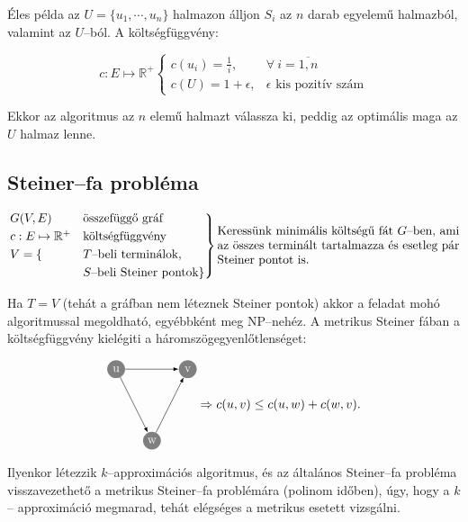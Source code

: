 Éles példa az $U=\{ u_1, \cdots, u_n \}$ halmazon álljon $S_i$ az $n$ darab
egyelemű halmazból, valamint az $U$--ból. A költségfüggvény:

\[ c:E \mapsto \mathbb{R}^+ \begin{cases} c({u_i})=\frac{1}{i}, & \forall~
i=\overline{1,n}\\
c(U)=1 + \epsilon, & \epsilon \mbox{ kis pozitív szám} \end{cases}\]

Ekkor az algoritmus az $n$ elemű halmazt válassza ki, peddig az optimális maga
az $U$ halmaz lenne.

\subsection{Steiner--fa probléma}

\[
\begin{rcases}
G(V,E) &\mbox{összefüggő gráf} \\
c:E \mapsto \mathbb{R}^+ &\mbox{költségfüggvény} \\
V = \{ &T\mbox{--beli terminálok}, \\
	   &S\mbox{--beli Steiner pontok}\}
\end{rcases}
\parbox[L]{7cm}{ Keressünk minimális költségű fát $G$--ben, ami az összes
terminált tartalmazza és esetleg pár Steiner pontot is.} \]

Ha $T=V$ (tehát a gráfban nem léteznek Steiner pontok) akkor a feladat mohó
algoritmussal megoldható, egyébbként meg NP--nehéz. A metrikus Steiner fában
a költségfüggvény kielégiti a háromszögegyenlőtlenséget:


\[ \parbox[l]{2.5cm}{
\begin{tikzpicture}[scale=1]
  \tikzset{ p/.style={circle,white,fill=gray,inner sep=0pt,minimum size=0.5cm},
  }
  \node[p] (1) at (0, -3) {w};
  \node[p] (2) at (-1, -1) {u}; 
  \node[p] (3) at (+1 , -1) {v};
  
  \draw[-latex] (2) -- (1) node [midway, above] {}; 
  \draw[-latex] (2) -- (3) node [midway, below] {}; 
  \draw[-latex] (1) -- (3) node [midway, above] {};
\end{tikzpicture}} \Rightarrow
  c(u,v) \leq c(u,w)+c(w,v). 
\]

Ilyenkor létezzik $k$--approximációs algoritmus, és az általános Steiner--fa
probléma visszavezethető a metrikus Steiner--fa problémára (polinom időben),
úgy, hogy a $k$-- approximáció megmarad, tehát elégséges a metrikus esetett
vizsgálni.

